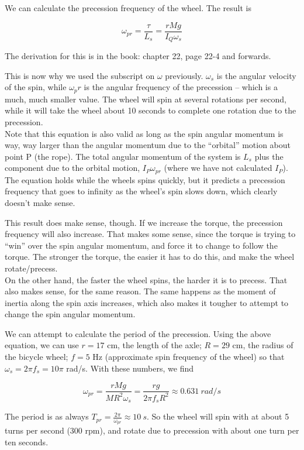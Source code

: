 We can calculate the precession frequency of the wheel. The result is

\begin{equation}
\omega_{pr} = \frac{\tau}{L_s} = \frac{r M g}{I_Q \omega_s}
\end{equation}

The derivation for this is in the book: chapter 22, page 22-4 and forwards.

This is now why we used the subscript on $\omega$ previously. $\omega_s$ is the angular velocity of the spin, while $\omega_pr$ is the angular frequency of the precession -- which is a much, much smaller value. The wheel will spin at several rotations per second, while it will take the wheel about 10 seconds to complete one rotation due to the precession.\\
Note that this equation is also valid as long as the spin angular momentum is way, way larger than the angular momentum due to the ``orbital'' motion about point P (the rope). The total angular momentum of the system is $L_s$ plus the component due to the orbital motion, $I_P \omega_{pr}$ (where we have not calculated $I_P$).\\
The equation holds while the wheels spins quickly, but it predicts a precession frequency that goes to infinity as the wheel's spin slows down, which clearly doesn't make sense.

This result does make sense, though. If we increase the torque, the precession frequency will also increase. That makes some sense, since the torque is trying to ``win'' over the spin angular momentum, and force it to change to follow the torque. The stronger the torque, the easier it has to do this, and make the wheel rotate/precess.\\
On the other hand, the faster the wheel spins, the harder it is to precess. That also makes sense, for the same reason. The same happens as the moment of inertia along the spin axis increases, which also makes it tougher to attempt to change the spin angular momentum.

We can attempt to calculate the period of the precession. Using the above equation, we can use $r = 17$ cm, the length of the axle; $R = 29$ cm, the radius of the bicycle wheel; $f = 5$ Hz (approximate spin frequency of the wheel) so that $\omega_s = 2 \pi f_s = 10 \pi$ rad/s. With these numbers, we find

\begin{equation}
\omega_{pr} = \frac{r M g}{M R^2 \omega_s} = \frac{r g}{2 \pi f_s R^2} \approx \SI{0.631}{rad/s}
\end{equation}

The period is as always $T_{pr} = \frac{2 \pi}{\omega_{pr}} \approx \SI{10}{s}$. So the wheel will spin with at about 5 turns per second (300 rpm), and rotate due to precession with about one turn per ten seconds.\\


